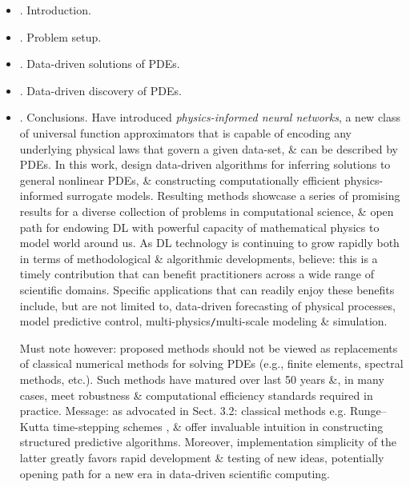 \documentclass{article}
\begin{document}
\begin{itemize}
	\item {. Introduction.}
	\item {. Problem setup.}
	\item {. Data-driven solutions of PDEs.}
	\item {. Data-driven discovery of PDEs.}
	\item {. Conclusions.} Have introduced {\it physics-informed neural networks}, a new class of universal function approximators that is capable of encoding any underlying physical laws that govern a given data-set, \& can be described by PDEs. In this work, design data-driven algorithms for inferring solutions to general nonlinear PDEs, \& constructing computationally efficient physics-informed surrogate models. Resulting methods showcase a series of promising results for a diverse collection of problems in computational science, \& open path for endowing DL with powerful capacity of mathematical physics to model world around us. As DL technology is continuing to grow rapidly both in terms of methodological \& algorithmic developments, believe: this is a timely contribution that can benefit practitioners across a wide range of scientific domains. Specific applications that can readily enjoy these benefits include, but are not limited to, data-driven forecasting of physical processes, model predictive control, multi-physics{\tt/}multi-scale modeling \& simulation.

	Must note however: proposed methods should not be viewed as replacements of classical numerical methods for solving PDEs (e.g., finite elements, spectral methods, etc.). Such methods have matured over last 50 years \&, in many cases, meet robustness \& computational efficiency standards required in practice. Message: as advocated in Sect. 3.2: classical methods e.g. Runge--Kutta time-stepping schemes , \& offer invaluable intuition in constructing structured predictive algorithms. Moreover, implementation simplicity of the latter greatly favors rapid development \& testing of new ideas, potentially opening path for a new era in data-driven scientific computing.


\end{itemize}
\end{document}
